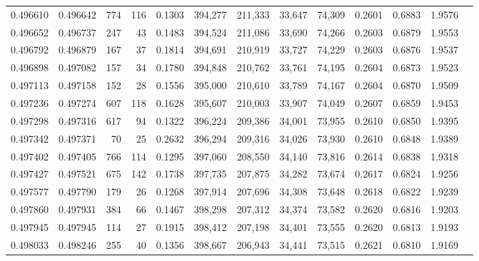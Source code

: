 \begin{tabular}{rrrrrrrrrrrrr}
0.496610 & 0.496642 &   774 &   116 &                                     0.1303 & 394,277 & 211,333 &  33,647 &  74,309 & 0.2601 & 0.6883 & 1.9576 \\
0.496652 & 0.496737 &   247 &    43 &                                     0.1483 & 394,524 & 211,086 &  33,690 &  74,266 & 0.2603 & 0.6879 & 1.9553 \\
0.496792 & 0.496879 &   167 &    37 &                                     0.1814 & 394,691 & 210,919 &  33,727 &  74,229 & 0.2603 & 0.6876 & 1.9537 \\
0.496898 & 0.497082 &   157 &    34 &                                     0.1780 & 394,848 & 210,762 &  33,761 &  74,195 & 0.2604 & 0.6873 & 1.9523 \\
0.497113 & 0.497158 &   152 &    28 &                                     0.1556 & 395,000 & 210,610 &  33,789 &  74,167 & 0.2604 & 0.6870 & 1.9509 \\
0.497236 & 0.497274 &   607 &   118 &                                     0.1628 & 395,607 & 210,003 &  33,907 &  74,049 & 0.2607 & 0.6859 & 1.9453 \\
0.497298 & 0.497316 &   617 &    94 &                                     0.1322 & 396,224 & 209,386 &  34,001 &  73,955 & 0.2610 & 0.6850 & 1.9395 \\
0.497342 & 0.497371 &    70 &    25 &                                     0.2632 & 396,294 & 209,316 &  34,026 &  73,930 & 0.2610 & 0.6848 & 1.9389 \\
0.497402 & 0.497405 &   766 &   114 &                                     0.1295 & 397,060 & 208,550 &  34,140 &  73,816 & 0.2614 & 0.6838 & 1.9318 \\
0.497427 & 0.497521 &   675 &   142 &                                     0.1738 & 397,735 & 207,875 &  34,282 &  73,674 & 0.2617 & 0.6824 & 1.9256 \\
0.497577 & 0.497790 &   179 &    26 &                                     0.1268 & 397,914 & 207,696 &  34,308 &  73,648 & 0.2618 & 0.6822 & 1.9239 \\
0.497860 & 0.497931 &   384 &    66 &                                     0.1467 & 398,298 & 207,312 &  34,374 &  73,582 & 0.2620 & 0.6816 & 1.9203 \\
0.497945 & 0.497945 &   114 &    27 &                                     0.1915 & 398,412 & 207,198 &  34,401 &  73,555 & 0.2620 & 0.6813 & 1.9193 \\
0.498033 & 0.498246 &   255 &    40 &                                     0.1356 & 398,667 & 206,943 &  34,441 &  73,515 & 0.2621 & 0.6810 & 1.9169 \\

\end{tabular}
